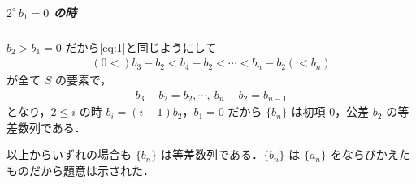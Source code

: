 \documentclass[../../main.tex]{subfiles}
\begin{document}
\subparagraph{$2^{\circ} \ b_1 = 0$ の時}

$b_2 > b_1 = 0$ だから\cref{eq:1}と同じようにして
\begin{align}
  (0 < ) b_3 - b_2 < b_4 - b_2 < \cdots < b_n - b_2 (< b_n)
\end{align}
が全て $S$ の要素で，
\begin{align}
  b_3 - b_2 = b_2, \cdots, \ b_n - b_2 = b_{n-1}
\end{align}
となり，$2 \le i$ の時 $b_i = (i-1) b_2$，$b_1=0$ だから $\{b_n\}$ は初項 $0$，公差 $b_2$ の等差数列である．
\casesend

以上からいずれの場合も $\{b_n\}$ は等差数列である．$\{b_n\}$ は $\{a_n\}$ をならびかえたものだから題意は示された．
\end{document}
